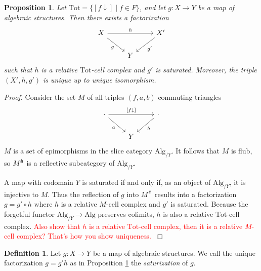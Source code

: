 \documentclass[a4paper]{article}
\newcommand{\todo}[1]{\textcolor{red}{#1}}
\newtheorem{proposition}[theorem]{Proposition}
\theoremstyle{remark}
\theoremstyle{definition}
\newtheorem{definition}[theorem]{Definition}
\begin{document}
\begin{proposition}
  \label{prop:saturation}
  Let $\mathrm{Tot} = \{ [f \downarrow] \mid f \in F \}$, and let $g : X \rightarrow Y$ be a map of algebraic structures.
  Then there exists a factorization
  \begin{equation}
    \begin{tikzcd}
      X \arrow[dr, "g"'] \arrow[rr, "h"] & & X' \arrow[dl, "g'"] \\
      & Y
    \end{tikzcd}
  \end{equation}
  such that $h$ is a relative $\mathrm{Tot}$-cell complex and $g'$ is saturated.
  Moreover, the triple $(X', h, g')$ is unique up to unique isomorphism.
\end{proposition}
\begin{proof}
  Consider the set $M$ of all triples $(f, a, b)$ commuting triangles
  \begin{equation}
    \begin{tikzcd}
      \cdot \arrow[dr, "a"'] \arrow[rr, "{[f \downarrow]}"] & & \cdot \arrow[dl, "b"] \\
      & Y
    \end{tikzcd}
  \end{equation}
  $M$ is a set of epimorphisms in the slice category $\mathrm{Alg}_{/ Y}$.
  It follows that $M$ is flub, so $M^\pitchfork$ is a reflective subcategory of $\mathrm{Alg}_{/ Y}$.
  
  A map with codomain $Y$ is saturated if and only if, as an object of $\mathrm{Alg}_{/ Y}$, it is injective to $M$.
  Thus the reflection of $g$ into $M^\pitchfork$ results into a factorization $g = g' \circ h$ where $h$ is a relative $M$-cell complex and $g'$ is saturated.
  Because the forgetful functor $\mathrm{Alg}_{/ Y} \rightarrow \mathrm{Alg}$ preserves colimits, $h$ is also a relative $\mathrm{Tot}$-cell complex.
  \todo{
    Also show that $h$ is a relative $\mathrm{Tot}$-cell complex, then it is a relative $M$-cell complex?
    That's how you show uniqueness.
  }
\end{proof}

\begin{definition}
  Let $g : X \rightarrow Y$ be a map of algebraic structures.
  We call the unique factorization $g = g' h$ as in Proposition \ref{prop:saturation} the \emph{saturization} of $g$.
\end{definition}
\end{document}
